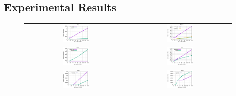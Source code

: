 \documentclass[conference,compsoc]{IEEEtran}
\begin{document}
\subsection{Experimental Results}

\begin{figure}[h!]
  \centering
  \setlength\tabcolsep{0.01pt}
  \begin{tabular}{cc}

    \includegraphics[width=0.265\textwidth]{plots/Map.eps} & \includegraphics[width=0.265\textwidth]{plots/Reduce.eps}\\
    \includegraphics[width=0.265\textwidth]{plots/Pack.eps} & \includegraphics[width=0.265\textwidth]{plots/Split.eps}\\
    \includegraphics[width=0.265\textwidth]{plots/Gather.eps} & \includegraphics[width=0.265\textwidth]{plots/Scatter.eps}\\

\end{tabular}
\end{figure}
\end{document}
